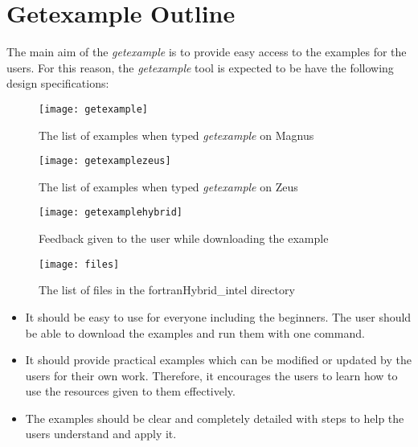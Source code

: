 
\section{Getexample Outline}

The main aim of the \emph{getexample} is to provide easy access to the examples for the users. For this reason, the \emph{getexample} tool is expected to be 
have the following design specifications:

\begin{figure}[!ht]
\begin{center}
\texttt{[image: getexample]}
\caption{The list of examples when typed \emph{getexample} on Magnus}
\end{center}
\end{figure}

\begin{figure}[!ht]
\begin{center}
\texttt{[image: getexamplezeus]}
\caption{The list of examples when typed \emph{getexample} on Zeus}
\end{center}
\end{figure}

\begin{figure}[!ht]
\begin{center}
\texttt{[image: getexamplehybrid]}
\caption{Feedback given to the user while downloading the example}
\end{center}
\end{figure}

\begin{figure}[!ht]
\begin{center}
\texttt{[image: files]}
\caption{The list of files in the fortranHybrid\_intel directory}
\end{center}
\end{figure}

\clearpage

\begin{itemize}
\item It should be easy to use for everyone including the beginners. The user should be able to download the examples and run them with one command.
\item It should provide practical examples which can be modified or updated by the users for their own work. Therefore, it encourages the users to learn
how to use the resources given to them effectively.
\item The examples should be clear and completely detailed with steps to help the users understand and apply it.
\end{itemize}

